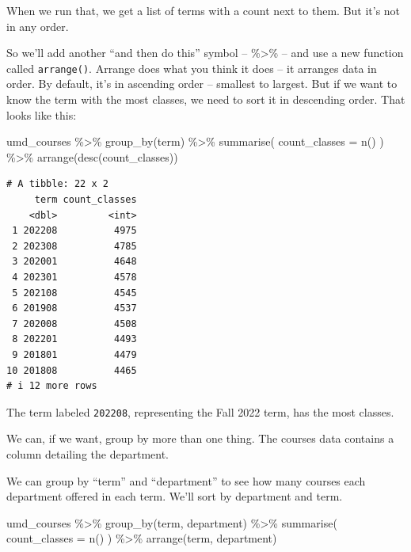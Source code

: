 \documentclass[
  letterpaper,
  DIV=11,
  numbers=noendperiod]{scrreprt}
\newenvironment{Shaded}{\begin{snugshade}}{\end{snugshade}}
\newcommand{\AttributeTok}[1]{\textcolor[rgb]{0.40,0.45,0.13}{#1}}
\newcommand{\FunctionTok}[1]{\textcolor[rgb]{0.28,0.35,0.67}{#1}}
\newcommand{\NormalTok}[1]{\textcolor[rgb]{0.00,0.23,0.31}{#1}}
\newcommand{\SpecialCharTok}[1]{\textcolor[rgb]{0.37,0.37,0.37}{#1}}
\begin{document}
When we run that, we get a list of terms with a count next to them. But
it's not in any order.

So we'll add another ``and then do this'' symbol -- \%\textgreater\% --
and use a new function called \texttt{arrange()}. Arrange does what you
think it does -- it arranges data in order. By default, it's in
ascending order -- smallest to largest. But if we want to know the term
with the most classes, we need to sort it in descending order. That
looks like this:

\begin{Shaded}
\begin{Highlighting}[]
\NormalTok{umd\_courses }\SpecialCharTok{\%\textgreater{}\%}
  \FunctionTok{group\_by}\NormalTok{(term) }\SpecialCharTok{\%\textgreater{}\%}
  \FunctionTok{summarise}\NormalTok{(}
    \AttributeTok{count\_classes =} \FunctionTok{n}\NormalTok{()}
\NormalTok{  ) }\SpecialCharTok{\%\textgreater{}\%}
  \FunctionTok{arrange}\NormalTok{(}\FunctionTok{desc}\NormalTok{(count\_classes))}
\end{Highlighting}
\end{Shaded}

\begin{verbatim}
# A tibble: 22 x 2
     term count_classes
    <dbl>         <int>
 1 202208          4975
 2 202308          4785
 3 202001          4648
 4 202301          4578
 5 202108          4545
 6 201908          4537
 7 202008          4508
 8 202201          4493
 9 201801          4479
10 201808          4465
# i 12 more rows
\end{verbatim}

The term labeled \texttt{202208}, representing the Fall 2022 term, has
the most classes.

We can, if we want, group by more than one thing. The courses data
contains a column detailing the department.

We can group by ``term'' and ``department'' to see how many courses each
department offered in each term. We'll sort by department and term.

\begin{Shaded}
\begin{Highlighting}[]
\NormalTok{umd\_courses }\SpecialCharTok{\%\textgreater{}\%}
  \FunctionTok{group\_by}\NormalTok{(term, department) }\SpecialCharTok{\%\textgreater{}\%}
  \FunctionTok{summarise}\NormalTok{(}
    \AttributeTok{count\_classes =} \FunctionTok{n}\NormalTok{()}
\NormalTok{  ) }\SpecialCharTok{\%\textgreater{}\%}
  \FunctionTok{arrange}\NormalTok{(term, department)}
\end{Highlighting}
\end{Shaded}
\end{document}
